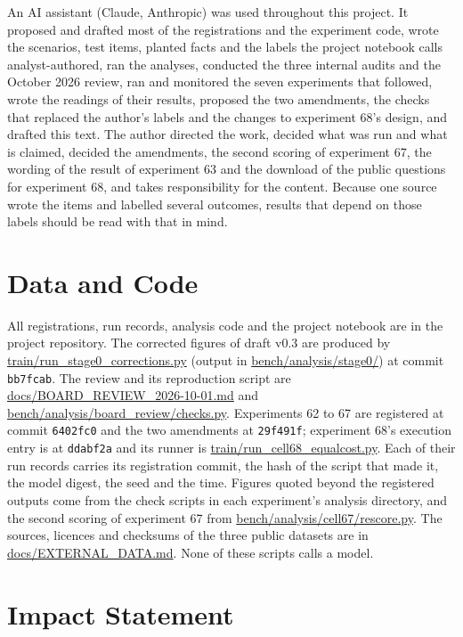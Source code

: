 \documentclass[10pt,twocolumn]{article}
\begin{document}
An AI assistant (Claude, Anthropic) was used throughout this project.
It proposed and drafted most of the registrations and the experiment
code, wrote the scenarios, test items, planted facts and the labels the
project notebook calls analyst-authored, ran the analyses, conducted
the three internal audits and the October 2026 review, ran and
monitored the seven experiments that followed, wrote the readings of
their results, proposed the two amendments, the checks that replaced
the author's labels and the changes to experiment 68's design, and
drafted this text. The author directed the work, decided what was run
and what is claimed, decided the amendments, the second scoring of
experiment 67, the wording of the result of experiment 63 and the
download of the public questions for experiment 68, and takes
responsibility for the content. Because one source wrote the items and labelled several
outcomes, results that depend on those labels should be read with that
in mind.

\section*{Data and Code}

All registrations, run records, analysis code and the project notebook
are in the project repository. The corrected figures of draft v0.3 are
produced by \url{train/run_stage0_corrections.py} (output in
\url{bench/analysis/stage0/}) at commit \texttt{bb7fcab}. The review
and its reproduction script are \url{docs/BOARD_REVIEW_2026-10-01.md}
and \url{bench/analysis/board_review/checks.py}. Experiments 62 to 67
are registered at commit \texttt{6402fc0} and the two amendments at
\texttt{29f491f}; experiment 68's execution entry is at
\texttt{ddabf2a} and its runner is
\url{train/run_cell68_equalcost.py}. Each of their run records carries
its registration commit, the hash of the script that made it, the model
digest, the seed and the time. Figures quoted beyond the registered
outputs come from the check scripts in each experiment's analysis
directory, and the second scoring of experiment 67 from
\url{bench/analysis/cell67/rescore.py}. The sources, licences and
checksums of the three public datasets are in
\url{docs/EXTERNAL_DATA.md}. None of these scripts calls a model.

\section*{Impact Statement}
\end{document}
